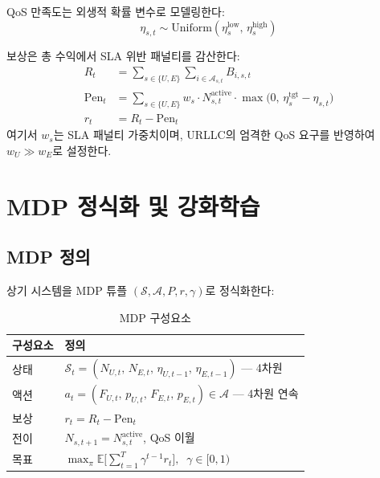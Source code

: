 \documentclass[10pt, twocolumn]{article}
\begin{document}
QoS 만족도는 외생적 확률 변수로 모델링한다:
\begin{equation}
  \eta_{s,t} \sim \text{Uniform}(\eta_s^{\text{low}},\, \eta_s^{\text{high}})
  \label{eq:qos}
\end{equation}

보상은 총 수익에서 SLA 위반 패널티를 감산한다\cite{kim2019}:
\begin{align}
  R_t &= \sum_{s \in \{U,E\}} \sum_{i \in \mathcal{A}_{s,t}} B_{i,s,t} \label{eq:revenue} \\
  \text{Pen}_t &= \sum_{s \in \{U,E\}} w_s \cdot N_{s,t}^{\text{active}} \cdot \max\!\big(0,\, \eta_s^{\text{tgt}} - \eta_{s,t}\big) \label{eq:penalty} \\
  r_t &= R_t - \text{Pen}_t \label{eq:reward}
\end{align}
여기서 $w_s$는 SLA 패널티 가중치이며, URLLC의 엄격한 QoS 요구를 반영하여 $w_U \gg w_E$로 설정한다.

\section{MDP 정식화 및 강화학습}

\subsection{MDP 정의}

상기 시스템을 MDP 튜플 $(\mathcal{S}, \mathcal{A}, P, r, \gamma)$로 정식화한다:

\begin{table}[h]
\centering
\caption{MDP 구성요소}
\label{tab:mdp}
\begin{tabular}{@{}ll@{}}
\toprule
구성요소 & 정의 \\
\midrule
상태 & $\mathcal{S}_t = (N_{U,t},\, N_{E,t},\, \eta_{U,t-1},\, \eta_{E,t-1})$ --- 4차원 \\
액션 & $a_t = (F_{U,t},\, p_{U,t},\, F_{E,t},\, p_{E,t}) \in \mathcal{A}$ --- 4차원 연속 \\
보상 & $r_t = R_t - \text{Pen}_t$ \\
전이 & $N_{s,t+1} = N_{s,t}^{\text{active}}$, QoS 이월 \\
목표 & $\max_\pi \mathbb{E}\!\Big[\sum_{t=1}^{T} \gamma^{t-1} r_t\Big],\;\; \gamma \in [0,1)$ \\
\bottomrule
\end{tabular}
\end{table}
\end{document}
